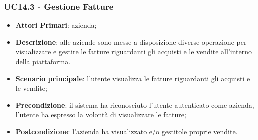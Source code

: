 \subsubsection{UC14.3 - Gestione Fatture}
\begin{itemize}
	\item \textbf{Attori Primari}: azienda;
	\item \textbf{Descrizione}: alle aziende sono messe a disposizione diverse operazione per visualizzare e gestire le fatture riguardanti gli acquisti e le vendite all'interno della piattaforma.
	\item \textbf{Scenario principale}: l'utente visualizza le fatture riguardanti gli acquisti e le vendite;
	 
	\item \textbf{Precondizione}: il sistema ha riconosciuto l'utente autenticato come azienda, l'utente ha espresso la volontà di visualizzare le fatture;
	\item \textbf{Postcondizione}: l'azienda ha visualizzato e/o gestitole proprie vendite.
\end{itemize} 
